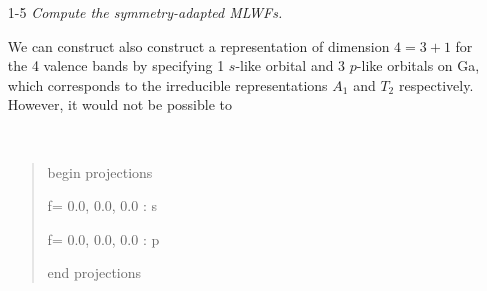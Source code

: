 \begin{itemize}
	\item[1-5] {\it  Compute the symmetry-adapted MLWFs.}

	We can construct also construct a representation of dimension $4=3+1$ for the 4 valence bands by specifying 1 $s$-like orbital and 3 $p$-like orbitals on Ga, which corresponds to the irreducible representations $A_1$ and $T_2$ respectively. However, it would not be possible to
{\tt
\begin{quote}
begin projections

f= 0.0, 0.0, 0.0 : s

f= 0.0, 0.0, 0.0 : p

end projections
\end{quote}
}

\end{itemize}
